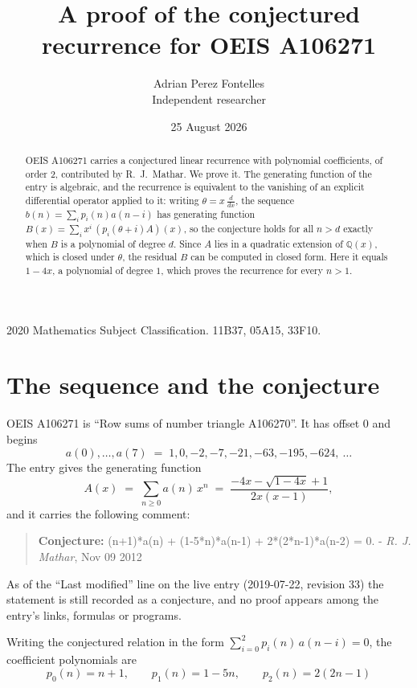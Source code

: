 \documentclass[11pt,a4paper]{article}
\title{A proof of the conjectured recurrence for OEIS A106271}
\author{Adrian Perez Fontelles\\ \small Independent researcher}
\date{25 August 2026}
\theoremstyle{plain}
\theoremstyle{definition}
\begin{document}
\maketitle

\begin{abstract}
OEIS A106271 carries a conjectured linear recurrence with polynomial coefficients, of
order 2, contributed by R.~J.~Mathar. We prove it. The generating function of the
entry is algebraic, and the recurrence is equivalent to the vanishing of an explicit
differential operator applied to it: writing $\theta=x\,\frac{d}{dx}$, the sequence
$b(n)=\sum_{i}p_{i}(n)a(n-i)$ has generating function
$B(x)=\sum_{i}x^{i}\,(p_{i}(\theta+i)A)(x)$, so the conjecture holds for all $n>d$ exactly
when $B$ is a polynomial of degree $d$. Since $A$ lies in a quadratic extension of
$\mathbb{Q}(x)$, which is closed under $\theta$, the residual $B$ can be computed in
closed form. Here it equals $1 - 4 x$, a polynomial of degree $1$, which proves
the recurrence for every $n>1$.
\end{abstract}

\noindent\small 2020 Mathematics Subject Classification. 11B37, 05A15, 33F10.\normalsize

\section{The sequence and the conjecture}

OEIS A106271 is ``Row sums of number triangle A106270''. It has offset $0$ and begins
\[
a(0),\dots,a(7)\;=\;1, 0, -2, -7, -21, -63, -195, -624,\ \dots
\]
The entry gives the generating function
\begin{equation}\label{eq:gf}
A(x)\;=\;\sum_{n\ge 0} a(n)\,x^{n}\;=\;\frac{- 4 x - \sqrt{1 - 4 x} + 1}{2 x \left(x - 1\right)} ,
\end{equation}
and it carries the following comment:
\begin{quote}\small
\textbf{Conjecture:} (n+1)*a(n) + (1-5*n)*a(n-1) + 2*(2*n-1)*a(n-2) = 0. - \emph{R. J. Mathar}, Nov 09 2012
\end{quote}
As of the ``Last modified'' line on the live entry (2019-07-22, revision 33) the
statement is still recorded as a conjecture, and no proof appears among the entry's links,
formulas or programs.

Writing the conjectured relation in the form $\sum_{i=0}^{2}p_{i}(n)\,a(n-i)=0$,
the coefficient polynomials are
\[
p_{0}(n)=n + 1,\qquad p_{1}(n)=1 - 5 n,\qquad p_{2}(n)=2 \left(2 n - 1\right)
\]
\end{document}
